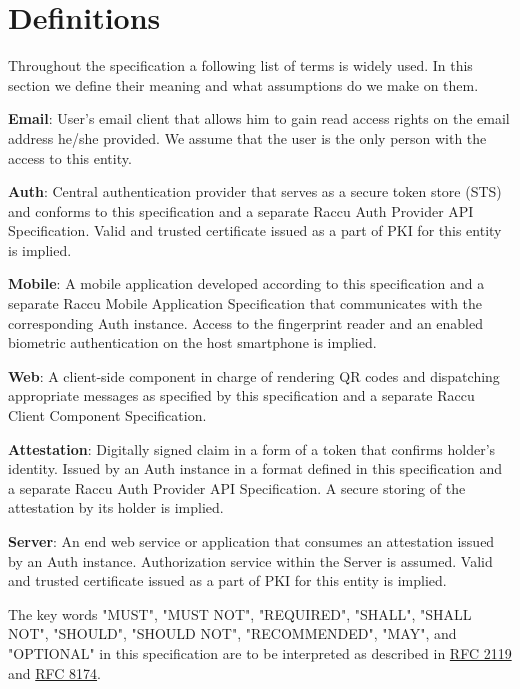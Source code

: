 \section{Definitions}
Throughout the specification a following list of terms is widely used. In this section we define their meaning 
and what assumptions do we make on them.

\medskip
\textbf{Email}: User's email client that allows him to gain read access rights on the email address he/she 
provided. We assume that the user is the only person with the access to this entity.

\medskip
\textbf{Auth}: Central authentication provider that serves as a secure token store (STS) and conforms to 
this specification and a separate Raccu Auth Provider API Specification. Valid and trusted certificate 
issued as a part of PKI for this entity is implied.

\medskip
\textbf{Mobile}: A mobile application developed according to this specification and a separate Raccu Mobile 
Application Specification that communicates with the corresponding Auth instance. Access to the fingerprint 
reader and an enabled biometric authentication on the host smartphone is implied.

\medskip
\textbf{Web}: A client-side component in charge of rendering QR codes and dispatching appropriate messages 
as specified by this specification and a separate Raccu Client Component Specification.

\medskip
\textbf{Attestation}: Digitally signed claim in a form of a token that confirms holder's identity. Issued by 
an Auth instance in a format defined in this specification and a separate Raccu Auth Provider API Specification. 
A secure storing of the attestation by its holder is implied.

\medskip
\textbf{Server}: An end web service or application that consumes an attestation issued by an Auth instance. 
Authorization service within the Server is assumed. Valid and trusted certificate issued as a part of PKI 
for this entity is implied.

\medskip
The key words "MUST", "MUST NOT", "REQUIRED", "SHALL", "SHALL NOT", "SHOULD", "SHOULD NOT", "RECOMMENDED", 
"MAY", and "OPTIONAL" in this specification are to be interpreted as described in 
\href{https://tools.ietf.org/html/rfc2119}{RFC 2119} and \href{https://tools.ietf.org/html/rfc8174}{RFC 8174}.